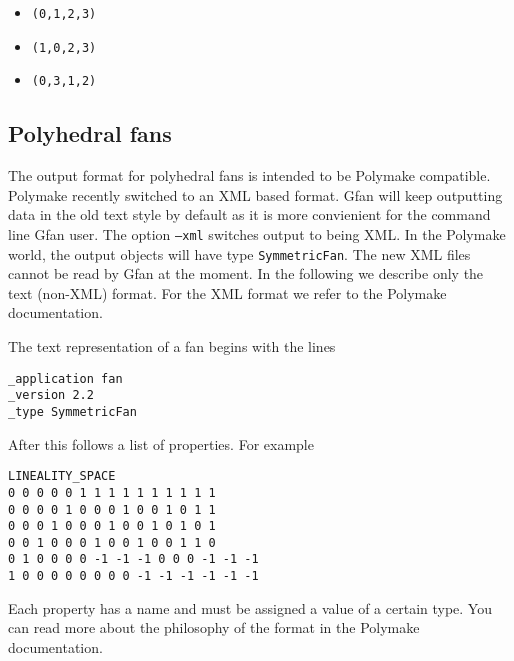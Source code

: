 \begin{itemize}
\item {\tt (0,1,2,3)}
\item {\tt (1,0,2,3)}
\item {\tt (0,3,1,2)}
\end{itemize}


\subsection{Polyhedral fans}
\label{sec:format fan}
\label{format:fan}
The output format for polyhedral fans is intended to be Polymake \cite{polymake} compatible. Polymake recently switched to an XML based format. Gfan will keep outputting data in the old text style by default as it is more convienient for the command line Gfan user. The option \texttt{--xml} switches output to being XML. In the Polymake world, the output objects will have type \texttt{SymmetricFan}. The new XML files cannot be read by Gfan at the moment. In the following we describe only the text (non-XML) format. For the XML format we refer to the Polymake documentation.

The text representation of a fan begins with the lines
\begin{verbatim}
_application fan
_version 2.2
_type SymmetricFan
\end{verbatim}
After this follows a list of properties. For example
\begin{verbatim}
LINEALITY_SPACE
0 0 0 0 0 1 1 1 1 1 1 1 1 1 1
0 0 0 0 1 0 0 0 1 0 0 1 0 1 1
0 0 0 1 0 0 0 1 0 0 1 0 1 0 1
0 0 1 0 0 0 1 0 0 1 0 0 1 1 0
0 1 0 0 0 0 -1 -1 -1 0 0 0 -1 -1 -1
1 0 0 0 0 0 0 0 0 -1 -1 -1 -1 -1 -1
\end{verbatim}
Each property has a name and must be assigned a value of a certain type. You can read more about the philosophy of the format in the Polymake documentation.

